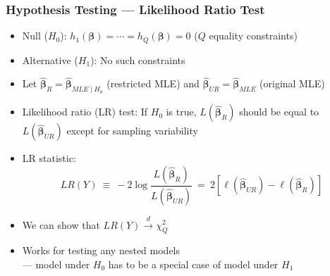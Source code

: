 \documentclass{beamer}
\begin{document}
\begin{frame}
\frametitle{Hypothesis Testing --- Likelihood Ratio Test}
\begin{itemize}[<+->]
\item Null ($H_0$): $h_1(\boldsymbol{\beta}) = \cdots = h_Q(\boldsymbol{\beta}) = 0$ ($Q$ equality constraints)
\item Alternative ($H_1$): No such constraints
\medskip
\item Let $\widehat{\boldsymbol{\beta}}_{R} = \widehat{\boldsymbol{\beta}}_{MLE\mid H_0}$ (restricted MLE) and
$\widehat{\boldsymbol{\beta}}_{UR} = \widehat{\boldsymbol{\beta}}_{MLE}$ (original MLE)
\item \alert{Likelihood ratio} (LR) test: If $H_0$ is true, $L(\widehat{\boldsymbol{\beta}}_R)$
should be equal to $L(\widehat{\boldsymbol{\beta}}_{UR})$ except for sampling variability
\item LR statistic:
    $$ LR(Y) \ \equiv \ -2\log\frac{L(\widehat{\boldsymbol{\beta}}_{R})}{L(\widehat{\boldsymbol{\beta}}_{UR})}
     \ = \ 2\left[\ell(\widehat{\boldsymbol{\beta}}_{UR}) - \ell(\widehat{\boldsymbol{\beta}}_{R})\right] $$
\item We can show that $LR(Y) \stackrel{d}{\longrightarrow} \chi_Q^2$
\item Works for testing any nested models \\
    --- model under $H_0$ has to be a special case of model under $H_1$
\end{itemize}

\end{frame}
\end{document}
